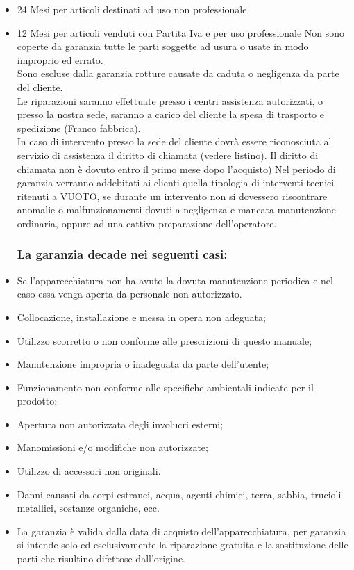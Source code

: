 \documentclass[a4paper]{article}
\begin{document}
\begin{itemize}
  \item 24 Mesi per articoli destinati ad uso non professionale
  \item 12 Mesi per articoli venduti con Partita Iva e per uso professionale Non sono coperte da garanzia tutte le parti soggette ad usura o usate in modo improprio ed errato.\\
Sono escluse dalla garanzia rotture causate da caduta o negligenza da parte del cliente.\\
Le riparazioni saranno effettuate presso i centri assistenza autorizzati, o presso la nostra sede, saranno a carico del cliente la spesa di trasporto e spedizione (Franco fabbrica).\\
In caso di intervento presso la sede del cliente dovrà essere riconosciuta al servizio di assistenza il diritto di chiamata (vedere listino). Il diritto di chiamata non è dovuto entro il primo mese dopo l'acquisto) Nel periodo di garanzia verranno addebitati ai clienti quella tipologia di interventi tecnici ritenuti a VUOTO, se durante un intervento non si dovessero riscontrare anomalie o malfunzionamenti dovuti a negligenza e mancata manutenzione ordinaria, oppure ad una cattiva preparazione dell'operatore.\\
\subsubsection{La garanzia decade nei seguenti casi:}
  \item Se l'apparecchiatura non ha avuto la dovuta manutenzione periodica e nel caso essa venga aperta da personale non autorizzato.
  \item Collocazione, installazione e messa in opera non adeguata;
  \item Utilizzo scorretto o non conforme alle prescrizioni di questo manuale;
  \item Manutenzione impropria o inadeguata da parte dell'utente;
  \item Funzionamento non conforme alle specifiche ambientali indicate per il prodotto;
  \item Apertura non autorizzata degli involucri esterni;
  \item Manomissioni e/o modifiche non autorizzate;
  \item Utilizzo di accessori non originali.
  \item Danni causati da corpi estranei, acqua, agenti chimici, terra, sabbia, trucioli metallici, sostanze organiche, ecc.
  \item La garanzia è valida dalla data di acquisto dell'apparecchiatura, per garanzia si intende solo ed esclusivamente la riparazione gratuita e la sostituzione delle parti che risultino difettose dall'origine.
\end{itemize}
\end{document}
